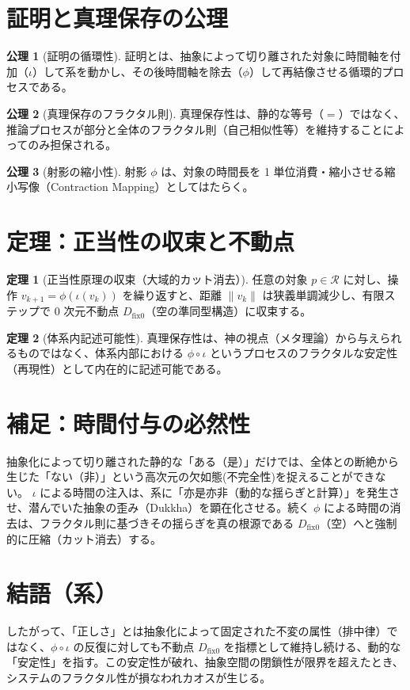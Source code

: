 \documentclass[11pt,a4paper]{article}
\theoremstyle{definition}
\newtheorem{axiom}{公理}[section]
\newtheorem{theorem}{定理}[section]
\newcommand{\dfix}{D_{\mathrm{fix}0}} %
\newcommand{\Rep}{\mathcal{R}}   %
\begin{document}
\section{証明と真理保存の公理}

\begin{axiom}[証明の循環性]
証明とは、抽象によって切り離された対象に時間軸を付加（$\iota$）して系を動かし、その後時間軸を除去（$\phi$）して再結像させる循環的プロセスである。
\end{axiom}

\begin{axiom}[真理保存のフラクタル則]
真理保存性は、静的な等号（$=$）ではなく、推論プロセスが部分と全体のフラクタル則（自己相似性等）を維持することによってのみ担保される。
\end{axiom}

\begin{axiom}[射影の縮小性]
射影 $\phi$ は、対象の時間長を 1 単位消費・縮小させる縮小写像（Contraction Mapping）としてはたらく。
\end{axiom}

\section{定理：正当性の収束と不動点}

\begin{theorem}[正当性原理の収束（大域的カット消去）]
任意の対象 $p \in \Rep$ に対し、操作 $v_{k+1} = \phi(\iota(v_k))$ を繰り返すと、距離 $\|v_k\|$ は狭義単調減少し、有限ステップで $0$ 次元不動点 $\dfix$（空の準同型構造）に収束する。
\end{theorem}

\begin{theorem}[体系内記述可能性]
真理保存性は、神の視点（メタ理論）から与えられるものではなく、体系内部における $\phi \circ \iota$ というプロセスのフラクタルな安定性（再現性）として内在的に記述可能である。
\end{theorem}

\section{補足：時間付与の必然性}
抽象化によって切り離された静的な「ある（是）」だけでは、全体との断絶から生じた「ない（非）」という高次元の欠如態(不完全性)を捉えることができない。
$\iota$ による時間の注入は、系に「亦是亦非（動的な揺らぎと計算）」を発生させ、潜んでいた抽象の歪み（Dukkha）を顕在化させる。続く $\phi$ による時間の消去は、フラクタル則に基づきその揺らぎを真の根源である $\dfix$（空）へと強制的に圧縮（カット消去）する。

\section*{結語（系）}
したがって、「正しさ」とは抽象化によって固定された不変の属性（排中律）ではなく、$\phi \circ \iota$ の反復に対しても不動点 $\dfix$ を指標として維持し続ける、動的な「安定性」を指す。この安定性が破れ、抽象空間の閉鎖性が限界を超えたとき、システムのフラクタル性が損なわれカオスが生じる。
\end{document}
